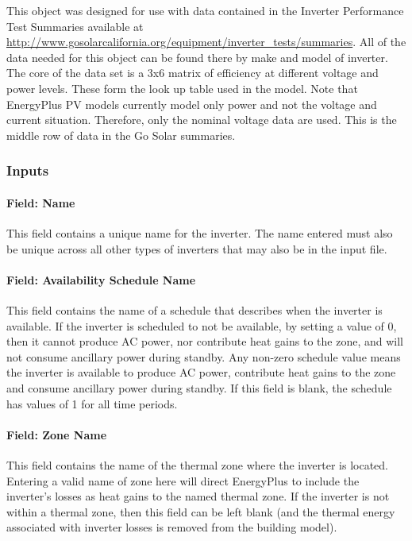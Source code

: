This object was designed for use with data contained in the Inverter Performance Test Summaries available at \url{http://www.gosolarcalifornia.org/equipment/inverter_tests/summaries}. All of the data needed for this object can be found there by make and model of inverter. The core of the data set is a 3x6 matrix of efficiency at different voltage and power levels. These form the look up table used in the model. Note that EnergyPlus PV models currently model only power and not the voltage and current situation. Therefore, only the nominal voltage data are used. This is the middle row of data in the Go Solar summaries.

\subsubsection{Inputs}\label{inputs-5-008}

\paragraph{Field: Name}\label{field-name-4-008}

This field contains a unique name for the inverter. The name entered must also be unique across all other types of inverters that may also be in the input file.

\paragraph{Field: Availability Schedule Name}\label{field-availability-schedule-name-3-001}

This field contains the name of a schedule that describes when the inverter is available. If the inverter is scheduled to not be available, by setting a value of 0, then it cannot produce AC power, nor contribute heat gains to the zone, and will not consume ancillary power during standby. Any non-zero schedule value means the inverter is available to produce AC power, contribute heat gains to the zone and consume ancillary power during standby. If this field is blank, the schedule has values of 1 for all time periods.

\paragraph{Field: Zone Name}\label{field-zone-name-3-000}

This field contains the name of the thermal zone where the inverter is located. Entering a valid name of zone here will direct EnergyPlus to include the inverter's losses as heat gains to the named thermal zone. If the inverter is not within a thermal zone, then this field can be left blank (and the thermal energy associated with inverter losses is removed from the building model).

